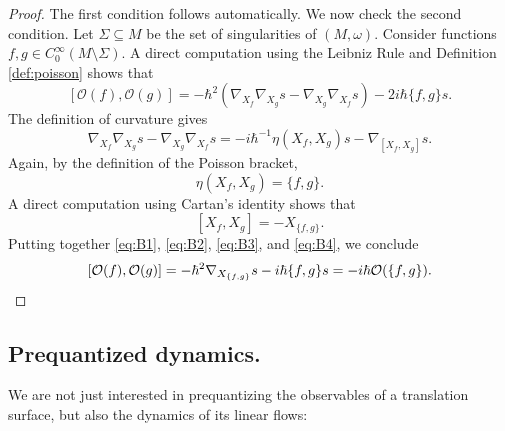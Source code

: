 \documentclass{amsart}
\theoremstyle{definition}
\theoremstyle{remark}
\numberwithin{equation}{section}
\newcommand{\<}{{\langle}}
\renewcommand{\>}{{\rangle}}
\begin{document}
\begin{proof}
    The first condition follows automatically. We now check the second condition. Let $\Sigma \subseteq M$ be the set of singularities of $(M,\omega)$. Consider functions $f,g \in C_0^\infty(M \setminus \Sigma)$. A direct computation using the Leibniz Rule and Definition \ref{def:poisson} shows that
    \begin{equation}
        \label{eq:B1}
        [\mathcal{O}(f) ,\mathcal{O}(g)] = -\hbar^2 (\nabla_{X_f} \nabla_{X_g}s - \nabla_{X_g} \nabla_{X_f} s) - 2 i \hbar \{f,g\}s.
    \end{equation}
    The definition of curvature gives
    \begin{equation}
        \label{eq:B2}
    \nabla_{X_f} \nabla_{X_g}s - \nabla_{X_g} \nabla_{X_f} s = -i\hbar^{-1}\eta(X_f,X_g) s - \nabla_{[X_f,X_g]} s.
    \end{equation}
    Again, by the definition of the Poisson bracket,
    \begin{equation}
        \label{eq:B3}
    \eta(X_f,X_g) = \{f,g\}.
    \end{equation}
    A direct computation using Cartan's identity shows that
    \begin{equation}
        \label{eq:B4}
    [X_f,X_g] = - X_{\{f,g\}}.
    \end{equation}
    Putting together \eqref{eq:B1}, \eqref{eq:B2}, \eqref{eq:B3}, and \eqref{eq:B4}, we conclude
    \[
    [\mathcal{O}(f) ,\mathcal{O}(g)] = -\hbar^2 \nabla_{X_{\{f,g\}}} s - i\hbar \{f,g\}s = -i \hbar \mathcal{O}(\{f,g\}). \qedhere
    \]
\end{proof}

\subsection{Prequantized dynamics.} We are not just interested in prequantizing the observables of a translation surface, but also the dynamics of its linear flows:
\end{document}
